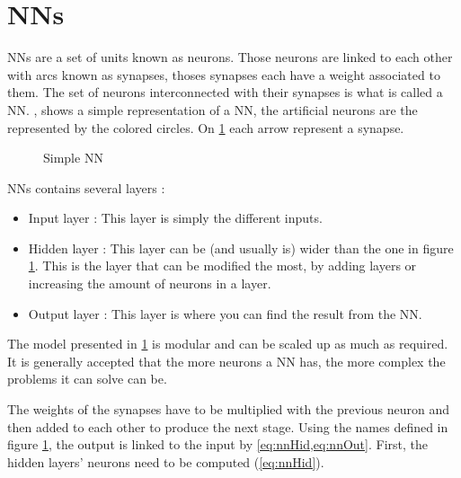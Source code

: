 \section{\aclp{NN}}\label{sec:nn}

\acfp{NN} are a set of units known as neurons. Those neurons are linked to each other with arcs known as synapses, thoses synapses each have a weight associated to them. The set of neurons interconnected with their synapses is what is called a \acl{NN}.
, shows a simple representation of a \ac{NN}, the artificial neurons are the represented by the colored circles. On \cref{fig:snn} each arrow represent a synapse.

\begin{figure}[h!]
  \centering
  
  \caption{Simple \acl{NN}}
  \label{fig:snn}
\end{figure}

\acp{NN} contains several layers :

\begin{itemize}
  \item Input layer : This layer is simply the different inputs.
  \item Hidden layer : This layer can be (and usually is) wider than the one in figure \ref{fig:snn}. This is the layer that can be modified the most, by adding layers or increasing the amount of neurons in a layer.
  \item Output layer : This layer is where you can find the result from the \ac{NN}.
\end{itemize}

The model presented in \cref{fig:snn} is modular and can be scaled up as much as required. It is generally accepted that the more neurons a \ac{NN} has, the more complex the problems  it can solve can be.

The weights of the synapses have to be multiplied with the previous neuron and then added to each other to produce the next stage. Using the names defined in figure \ref{fig:snn}, the output is linked to the input by \cref{eq:nnHid,eq:nnOut}. First, the hidden layers' neurons need to be computed (\cref{eq:nnHid}).

